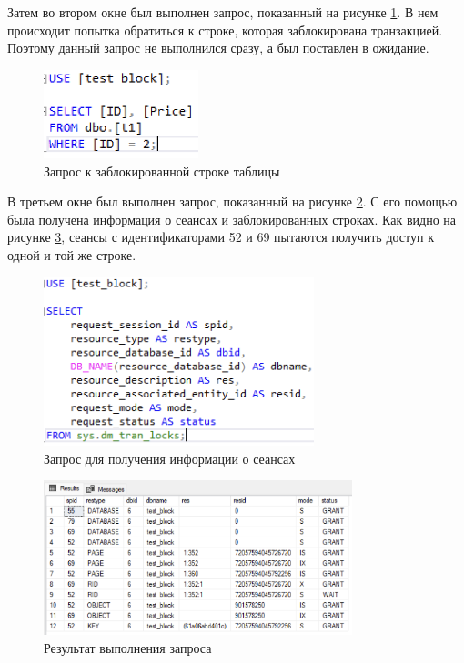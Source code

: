 \documentclass[a4paper, 14pt]{extarticle}
\begin{document}
Затем во втором окне был выполнен запрос, показанный на рисунке
\ref{fig:task-2-4}. В нем происходит попытка обратиться к строке, которая
заблокирована транзакцией. Поэтому данный запрос не выполнился сразу, а был
поставлен в ожидание.

\begin{figure}[H]
  \centering
  \includegraphics[width=0.4\textwidth]{images/task-2/4.png}
  \caption{Запрос к заблокированной строке таблицы}
  \label{fig:task-2-4}
\end{figure}

В третьем окне был выполнен запрос, показанный на рисунке \ref{fig:task-2-5}. С
его помощью была получена информация о сеансах и заблокированных строках. Как
видно на рисунке \ref{fig:task-2-6}, сеансы с идентификаторами 52 и 69 пытаются
получить доступ к одной и той же строке.

\begin{figure}[H]
  \centering
  \includegraphics[width=0.7\textwidth]{images/task-2/5.png}
  \caption{Запрос для получения информации о сеансах}
  \label{fig:task-2-5}
\end{figure}

\begin{figure}[H]
  \centering
  \includegraphics[width=0.8\textwidth]{images/task-2/6.png}
  \caption{Результат выполнения запроса}
  \label{fig:task-2-6}
\end{figure}
\end{document}
